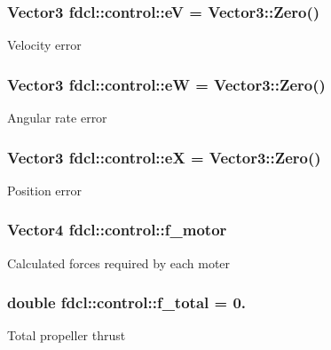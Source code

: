 \subsubsection[{\texorpdfstring{eV}{eV}}]{\setlength{\rightskip}{0pt plus 5cm}Vector3 fdcl\+::control\+::eV = Vector3\+::\+Zero()}\hypertarget{classfdcl_1_1control_aa0c21496bf7ffffa421e6431c1581bad}{}\label{classfdcl_1_1control_aa0c21496bf7ffffa421e6431c1581bad}
Velocity error 
\subsubsection[{\texorpdfstring{eW}{eW}}]{\setlength{\rightskip}{0pt plus 5cm}Vector3 fdcl\+::control\+::eW = Vector3\+::\+Zero()}\hypertarget{classfdcl_1_1control_a3831084838463bafbf25ad50ce39df6d}{}\label{classfdcl_1_1control_a3831084838463bafbf25ad50ce39df6d}
Angular rate error 
\subsubsection[{\texorpdfstring{eX}{eX}}]{\setlength{\rightskip}{0pt plus 5cm}Vector3 fdcl\+::control\+::eX = Vector3\+::\+Zero()}\hypertarget{classfdcl_1_1control_ad32044f0b435db25f67e5c2f4a5d91d8}{}\label{classfdcl_1_1control_ad32044f0b435db25f67e5c2f4a5d91d8}
Position error 
\subsubsection[{\texorpdfstring{f\+\_\+motor}{f_motor}}]{\setlength{\rightskip}{0pt plus 5cm}Vector4 fdcl\+::control\+::f\+\_\+motor}\hypertarget{classfdcl_1_1control_aaad0595254a9a993566163d813830491}{}\label{classfdcl_1_1control_aaad0595254a9a993566163d813830491}
Calculated forces required by each moter 
\subsubsection[{\texorpdfstring{f\+\_\+total}{f_total}}]{\setlength{\rightskip}{0pt plus 5cm}double fdcl\+::control\+::f\+\_\+total = 0.}\hypertarget{classfdcl_1_1control_a14297e7595c3f41cd953a34c767c24f0}{}\label{classfdcl_1_1control_a14297e7595c3f41cd953a34c767c24f0}
Total propeller thrust 
